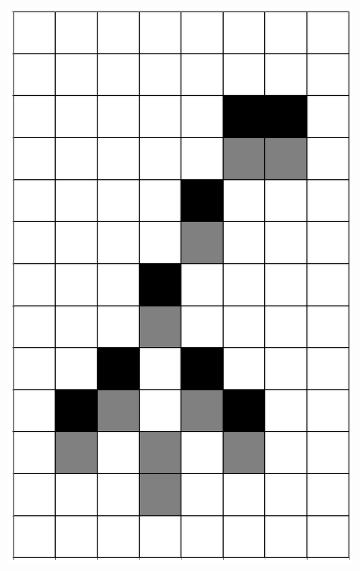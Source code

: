 \documentclass[12pt]{article}
\numberwithin{figure}{section} %
\begin{document}
\begin{figure}[H]
\begin{subfigure}{0.3\textwidth}
     \includegraphics[angle=270,width=\linewidth]{Section4/13.1}
     \subcaption{}
   \end{subfigure}
        \begin{subfigure}{0.3\textwidth}
     \centering

\end{subfigure}
\end{figure}
\end{document}
